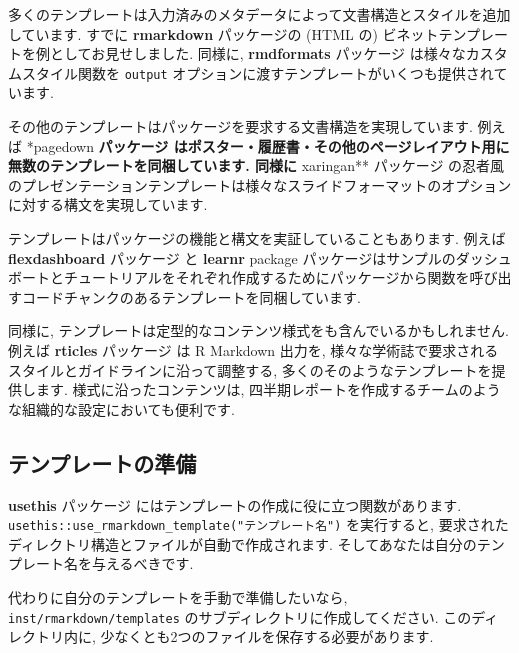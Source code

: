\documentclass[
  11pt,
]{bxjsreport}
\begin{document}
多くのテンプレートは入力済みのメタデータによって文書構造とスタイルを追加しています. すでに \textbf{rmarkdown} パッケージの (HTML の) ビネットテンプレートを例としてお見せしました. 同様に, \textbf{rmdformats} パッケージ \autocite{R-rmdformats} は様々なカスタムスタイル関数を \texttt{output} オプションに渡すテンプレートがいくつも提供されています.

その他のテンプレートはパッケージを要求する文書構造を実現しています. 例えば *pagedown\textbf{ パッケージ \autocite{R-pagedown} はポスター・履歴書・その他のページレイアウト用に無数のテンプレートを同梱しています. 同様に }xaringan** パッケージ \autocite{R-xaringan} の忍者風のプレゼンテーションテンプレートは様々なスライドフォーマットのオプションに対する構文を実現しています.

テンプレートはパッケージの機能と構文を実証していることもあります. 例えば \textbf{flexdashboard} パッケージ \autocite{R-flexdashboard} と \textbf{learnr} package \autocite{R-learnr} パッケージはサンプルのダッシュボートとチュートリアルをそれぞれ作成するためにパッケージから関数を呼び出すコードチャンクのあるテンプレートを同梱しています.

同様に, テンプレートは定型的なコンテンツ様式をも含んでいるかもしれません. 例えば \textbf{rticles} パッケージ \autocite{R-rticles} は R Markdown 出力を, 様々な学術誌で要求されるスタイルとガイドラインに沿って調整する, 多くのそのようなテンプレートを提供します. 様式に沿ったコンテンツは, 四半期レポートを作成するチームのような組織的な設定においても便利です.

\hypertarget{ux30c6ux30f3ux30d7ux30ecux30fcux30c8ux306eux6e96ux5099}{%
\subsection{テンプレートの準備}\label{ux30c6ux30f3ux30d7ux30ecux30fcux30c8ux306eux6e96ux5099}}

\textbf{usethis} パッケージ \autocite{R-usethis} にはテンプレートの作成に役に立つ関数があります. \texttt{usethis::use\_rmarkdown\_template("テンプレート名")} を実行すると, 要求されたディレクトリ構造とファイルが自動で作成されます. そしてあなたは自分のテンプレート名を与えるべきです.

代わりに自分のテンプレートを手動で準備したいなら, \texttt{inst/rmarkdown/templates} のサブディレクトリに作成してください. このディレクトリ内に, 少なくとも2つのファイルを保存する必要があります.
\end{document}
